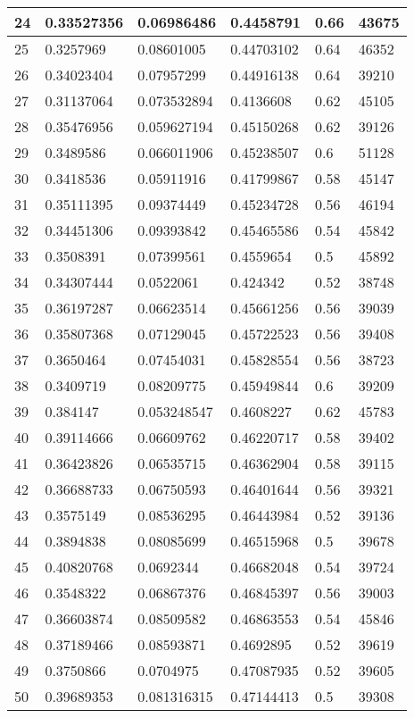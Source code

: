 \begin{longtable}{|l|l|l|l|l|l|}
24 & 0.33527356 & 0.06986486 & 0.4458791 & 0.66 & 43675 \\ \hline 
25 & 0.3257969 & 0.08601005 & 0.44703102 & 0.64 & 46352 \\ \hline 
26 & 0.34023404 & 0.07957299 & 0.44916138 & 0.64 & 39210 \\ \hline 
27 & 0.31137064 & 0.073532894 & 0.4136608 & 0.62 & 45105 \\ \hline 
28 & 0.35476956 & 0.059627194 & 0.45150268 & 0.62 & 39126 \\ \hline 
29 & 0.3489586 & 0.066011906 & 0.45238507 & 0.6 & 51128 \\ \hline 
30 & 0.3418536 & 0.05911916 & 0.41799867 & 0.58 & 45147 \\ \hline 
31 & 0.35111395 & 0.09374449 & 0.45234728 & 0.56 & 46194 \\ \hline 
32 & 0.34451306 & 0.09393842 & 0.45465586 & 0.54 & 45842 \\ \hline 
33 & 0.3508391 & 0.07399561 & 0.4559654 & 0.5 & 45892 \\ \hline 
34 & 0.34307444 & 0.0522061 & 0.424342 & 0.52 & 38748 \\ \hline 
35 & 0.36197287 & 0.06623514 & 0.45661256 & 0.56 & 39039 \\ \hline 
36 & 0.35807368 & 0.07129045 & 0.45722523 & 0.56 & 39408 \\ \hline 
37 & 0.3650464 & 0.07454031 & 0.45828554 & 0.56 & 38723 \\ \hline 
38 & 0.3409719 & 0.08209775 & 0.45949844 & 0.6 & 39209 \\ \hline 
39 & 0.384147 & 0.053248547 & 0.4608227 & 0.62 & 45783 \\ \hline 
40 & 0.39114666 & 0.06609762 & 0.46220717 & 0.58 & 39402 \\ \hline 
41 & 0.36423826 & 0.06535715 & 0.46362904 & 0.58 & 39115 \\ \hline 
42 & 0.36688733 & 0.06750593 & 0.46401644 & 0.56 & 39321 \\ \hline 
43 & 0.3575149 & 0.08536295 & 0.46443984 & 0.52 & 39136 \\ \hline 
44 & 0.3894838 & 0.08085699 & 0.46515968 & 0.5 & 39678 \\ \hline 
45 & 0.40820768 & 0.0692344 & 0.46682048 & 0.54 & 39724 \\ \hline 
46 & 0.3548322 & 0.06867376 & 0.46845397 & 0.56 & 39003 \\ \hline 
47 & 0.36603874 & 0.08509582 & 0.46863553 & 0.54 & 45846 \\ \hline 
48 & 0.37189466 & 0.08593871 & 0.4692895 & 0.52 & 39619 \\ \hline 
49 & 0.3750866 & 0.0704975 & 0.47087935 & 0.52 & 39605 \\ \hline 
50 & 0.39689353 & 0.081316315 & 0.47144413 & 0.5 & 39308 \\ \hline 
\end{longtable}